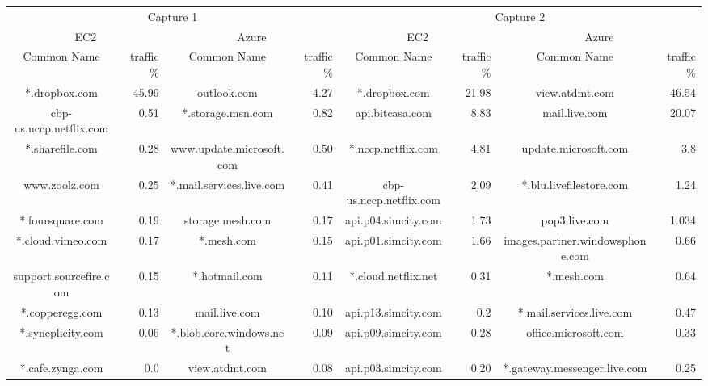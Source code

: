 \begin{tabular}{|c|r|c|r|c|r|c|r|} \hline
\multicolumn{4}{|c|}{Capture 1} & \multicolumn{4}{|c|}{Capture 2}\\
\multicolumn{2}{|c|}{EC2} & \multicolumn{2}{|c|}{Azure} & \multicolumn{2}{|c|}{EC2} & \multicolumn{2}{|c|}{Azure} \\
\hline
Common Name & traffic  \% & Common Name & traffic  \% & Common Name & traffic  \% & Common Name & traffic  \% \\ \hline
*.dropbox.com &  45.99 & 	outlook.com & 4.27 & *.dropbox.com & 21.98 & view.atdmt.com & 46.54 \\
cbp-us.nccp.netflix.com & 0.51 & *.storage.msn.com & 0.82 & api.bitcasa.com & 8.83 & mail.live.com & 20.07 \\
*.sharefile.com &  0.28  & www.update.microsoft.com & 0.50 & *.nccp.netflix.com & 4.81 & update.microsoft.com & 3.8 \\
www.zoolz.com & 0.25 & *.mail.services.live.com & 0.41 & cbp-us.nccp.netflix.com & 2.09 & *.blu.livefilestore.com & 1.24 \\
*.foursquare.com & 0.19 & storage.mesh.com & 0.17 & api.p04.simcity.com & 1.73 & pop3.live.com & 1.034 \\
*.cloud.vimeo.com & 0.17 & *.mesh.com & 0.15 & api.p01.simcity.com & 1.66 & images.partner.windowsphone.com & 0.66 \\
support.sourcefire.com & 0.15 & *.hotmail.com & 0.11 & *.cloud.netflix.net & 0.31 & *.mesh.com & 0.64 \\
*.copperegg.com & 0.13 & mail.live.com & 0.10 & api.p13.simcity.com & 0.2 & *.mail.services.live.com & 0.47 \\
*.syncplicity.com & 0.06 & *.blob.core.windows.net & 0.09 & api.p09.simcity.com & 0.28 & office.microsoft.com & 0.33 \\
*.cafe.zynga.com & 0.0 & view.atdmt.com & 0.08 & api.p03.simcity.com & 0.20 & *.gateway.messenger.live.com & 0.25 \\
\hline
\end{tabular}

